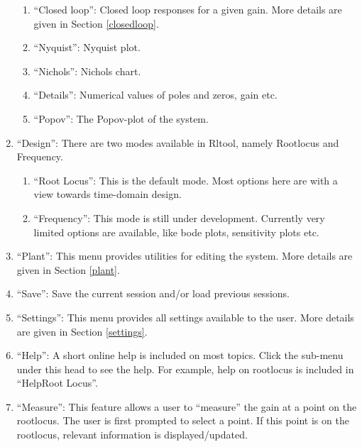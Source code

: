 \begin{enumerate}
 \begin{enumerate}
\item ``Closed loop'': Closed loop responses for a given gain. More
  details are given in Section \ref{closedloop}.
\item ``Nyquist'': Nyquist plot.
\item ``Nichols'': Nichols chart.
\item ``Details'': Numerical values of poles and zeros, gain etc.
\item ``Popov'': The Popov-plot of the system.
\end{enumerate}
\item ``Design'': There are two modes available in Rltool, namely
  Rootlocus and Frequency.
 \begin{enumerate}
    \item ``Root Locus'': This is the default mode. Most options here
    are with a view towards time-domain design.
    \item ``Frequency'': This mode is still under
    development. Currently very limited options are available, like
    bode plots, sensitivity plots etc. 
  \end{enumerate}
\item ``Plant'': This menu provides utilities for editing the
  system. More details are given in Section \ref{plant}.
\item ``Save'': Save the current session and/or load previous
  sessions.
\item ``Settings'': This menu provides all settings available to the
  user. More details are given in Section \ref{settings}.
\item ``Help'': A short online help is included on most topics. Click
  the sub-menu under this head to see the help. For example, help on
  rootlocus is included in ``Help\rar Root Locus''. 
\item ``Measure'': This feature allows a user to ``measure'' the gain
  at a point on the rootlocus. The user is first prompted to select a
  point. If this point is on the rootlocus, relevant information is
  displayed/updated. 
\end{enumerate}
